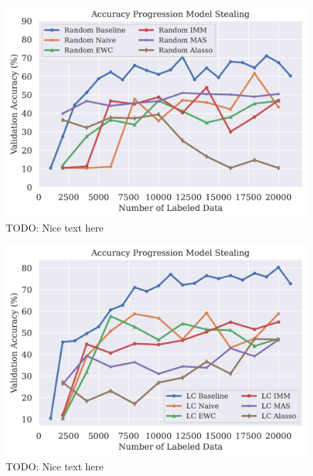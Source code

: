 \begin{figure}[h]
    \centering
    \includegraphics[width=0.8\linewidth]{images/results_CALMS/mnist_label_random.png}
    \caption[Accuracy Comparison for Model Stealing on MNIST using the top1-label and the Active Learning strategy Random]{TODO: Nice text here}
    \label{fig:CALMSMNISTLabelRandom}
\end{figure}

\begin{figure}[h]
    \centering
    \includegraphics[width=0.8\linewidth]{images/results_CALMS/mnist_label_lc.png}
    \caption[Accuracy Comparison for Model Stealing on MNIST using the top1-label and the Active Learning strategy LC]{TODO: Nice text here}
    \label{fig:CALMSMNISTLabelLC}
\end{figure}


